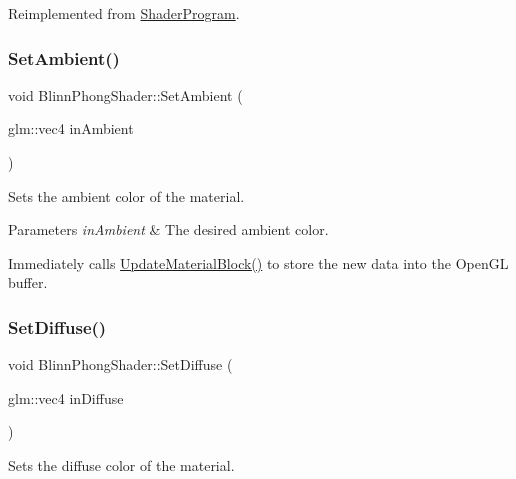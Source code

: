 Reimplemented from \hyperlink{class_shader_program_a51ac6fbf3a3d88643eef303a4c3a1fa8}{Shader\+Program}.

\hypertarget{class_blinn_phong_shader_a0f8c1c478525dd662922597ea7d9c4ac}{}\label{class_blinn_phong_shader_a0f8c1c478525dd662922597ea7d9c4ac} 
\subsubsection{\texorpdfstring{Set\+Ambient()}{SetAmbient()}}
{\footnotesize\ttfamily void Blinn\+Phong\+Shader\+::\+Set\+Ambient (\begin{DoxyParamCaption}\item[{glm\+::vec4}]{in\+Ambient }\end{DoxyParamCaption})\hspace{0.3cm}{\ttfamily [virtual]}}



Sets the ambient color of the material. 


\begin{DoxyParams}{Parameters}
{\em in\+Ambient} & The desired ambient color.\\
\hline
\end{DoxyParams}
Immediately calls \hyperlink{class_blinn_phong_shader_aa247270120b46431b436220ea6e777be}{Update\+Material\+Block()} to store the new data into the Open\+GL buffer. \hypertarget{class_blinn_phong_shader_a610957f435f1ef817e7d2c4350e55181}{}\label{class_blinn_phong_shader_a610957f435f1ef817e7d2c4350e55181} 
\subsubsection{\texorpdfstring{Set\+Diffuse()}{SetDiffuse()}}
{\footnotesize\ttfamily void Blinn\+Phong\+Shader\+::\+Set\+Diffuse (\begin{DoxyParamCaption}\item[{glm\+::vec4}]{in\+Diffuse }\end{DoxyParamCaption})\hspace{0.3cm}{\ttfamily [virtual]}}



Sets the diffuse color of the material. 


